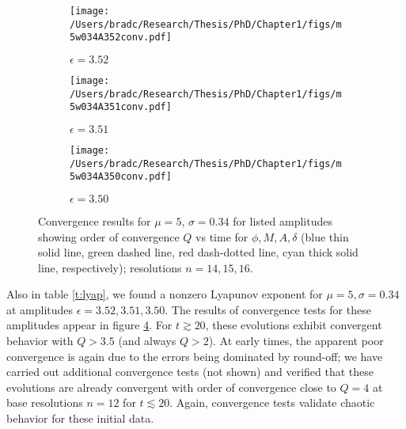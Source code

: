 \documentclass[../PhD.tex]{subfiles}
\begin{document}
\begin{subappendices}
\begin{figure}[!t]
\centering
\begin{subfigure}[t]{0.31\textwidth}
\texttt{[image: /Users/bradc/Research/Thesis/PhD/Chapter1/figs/m5w034A352conv.pdf]}
\caption{$\epsilon=3.52$}
\label{f:m5w034A352conv}
\end{subfigure}
\begin{subfigure}[t]{0.31\textwidth}
\texttt{[image: /Users/bradc/Research/Thesis/PhD/Chapter1/figs/m5w034A351conv.pdf]}
\caption{$\epsilon=3.51$}
\label{f:m5w034A351conv}
\end{subfigure}
\begin{subfigure}[t]{0.31\textwidth}
\texttt{[image: /Users/bradc/Research/Thesis/PhD/Chapter1/figs/m5w034A350conv.pdf]}
\caption{$\epsilon=3.50$}
\label{f:m5w034A350conv}
\end{subfigure}
\caption[Order of convergence for $\phi$, $M$, $A$, $\delta$ as a function of time for $\mu = 5$ at nearby amplitudes]{Convergence results for $\mu=5$, $\sigma=0.34$ for listed amplitudes
showing order of convergence $Q$ vs time for $\phi,M,A,\delta$ 
 (blue thin solid line, green dashed line, red 
dash-dotted line, cyan thick solid line, respectively); resolutions $n=14,15,16$.
}
\label{f:m5w034convergence}
\end{figure}

Also in table \ref{t:lyap}, we found a nonzero Lyapunov exponent for 
$\mu=5,\sigma=0.34$ at amplitudes $\epsilon=3.52,3.51,3.50$.  The results
of convergence tests for these amplitudes appear in figure 
\ref{f:m5w034convergence}.  For $t\gtrsim 20$, these evolutions exhibit 
convergent behavior with $Q>3.5$ (and always $Q>2$).  At early times, the 
apparent poor convergence is again due to the errors being dominated by
round-off; we have carried out additional convergence tests (not shown) and
verified that these evolutions are already convergent with order of 
convergence close to $Q=4$ at base resolutions $n=12$ for $t\lesssim 20$.
Again, convergence tests validate chaotic behavior for these initial data.




\end{subappendices}
\end{document}
